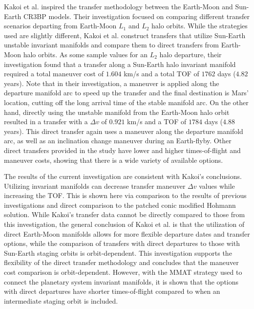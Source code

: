 Kakoi et al. inspired the transfer methodology between the Earth-Moon and Sun-Earth CR3BP
models\cite{Kakoi:2014,Kakoi:2015}. Their investigation focused on comparing different transfer
scenarios departing from Earth-Moon $L_{1}$ and $L_{2}$ halo orbits. While the strategies used are
slightly different, Kakoi et al. construct transfers that utilize Sun-Earth unstable invariant
manifolds and compare them to direct transfers from Earth-Moon halo orbits. As some sample values
for an $L_{2}$ halo departure, their investigation found that a transfer along a Sun-Earth halo
invariant manifold required a total maneuver cost of $1.604$ km/s and a total TOF of $1762$ days
($4.82$ years). Note that in their investigation, a maneuver is applied along the departure
manifold arc to speed up the transfer and the final destination is Mars' location, cutting off the
long arrival time of the stable manifold arc. On the other hand, directly using the unstable
manifold from the Earth-Moon halo orbit resulted in a transfer with a $\Delta v$ of $0.921$ km/s
and a TOF of $1784$ days ($4.88$ years)\cite{Kakoi:2015}. This direct transfer again uses a
maneuver along the departure manifold arc, as well as an inclination change maneuver during an
Earth-flyby. Other direct transfers provided in the study have lower and higher times-of-flight and
maneuver costs, showing that there is a wide variety of available options.

The results of the current investigation are consistent with Kakoi's conclusions. Utilizing
invariant manifolds can decrease transfer maneuver $\Delta v$ values while increasing the
TOF\cite{Kakoi:2015}. This is shown here via comparison to the results of previous investigations
and direct comparison to the patched conic modified Hohmann solution. While Kakoi's transfer data
cannot be directly compared to those from this investigation, the general conclusion of Kakoi et
al. is that the utilization of direct Earth-Moon manifolds allows for more flexible departure dates
and transfer options, while the comparison of transfers with direct departures to those with
Sun-Earth staging orbits is orbit-dependent\cite{Kakoi:2014,Kakoi:2015}. This investigation
supports the flexibility of the direct transfer methodology and concludes that the maneuver cost
comparison is orbit-dependent. However, with the MMAT strategy used to connect the planetary system
invariant manifolds, it is shown that the options with direct departures have shorter
times-of-flight compared to when an intermediate staging orbit is included.

